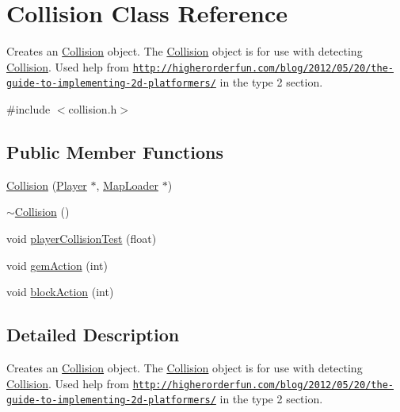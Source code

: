 \hypertarget{class_collision}{\section{Collision Class Reference}
\label{class_collision}
}


Creates an \hyperlink{class_collision}{Collision} object. The \hyperlink{class_collision}{Collision} object is for use with detecting \hyperlink{class_collision}{Collision}. Used help from \href{http://higherorderfun.com/blog/2012/05/20/the-guide-to-implementing-2d-platformers/}{\tt http\+://higherorderfun.\+com/blog/2012/05/20/the-\/guide-\/to-\/implementing-\/2d-\/platformers/} in the type 2 section.  




{\ttfamily \#include $<$collision.\+h$>$}

\subsection*{Public Member Functions}
\begin{DoxyCompactItemize}
\item 
\hyperlink{class_collision_a975df63cb6f3b4d746191ff8348598fb}{Collision} (\hyperlink{class_player}{Player} $\ast$, \hyperlink{class_map_loader}{Map\+Loader} $\ast$)
\item 
\hyperlink{class_collision_a19ae49bcb3b16f4622443a34a171590c}{$\sim$\+Collision} ()
\item 
void \hyperlink{class_collision_ac7635cf9b887dcd4ffc3cf15f35e39a9}{player\+Collision\+Test} (float)
\item 
void \hyperlink{class_collision_a8a7c7bbaa789c0867559d79ef186dd84}{gem\+Action} (int)
\item 
void \hyperlink{class_collision_aaf2c586cbf92070483282ab66090e5dc}{block\+Action} (int)
\end{DoxyCompactItemize}


\subsection{Detailed Description}
Creates an \hyperlink{class_collision}{Collision} object. The \hyperlink{class_collision}{Collision} object is for use with detecting \hyperlink{class_collision}{Collision}. Used help from \href{http://higherorderfun.com/blog/2012/05/20/the-guide-to-implementing-2d-platformers/}{\tt http\+://higherorderfun.\+com/blog/2012/05/20/the-\/guide-\/to-\/implementing-\/2d-\/platformers/} in the type 2 section. 

